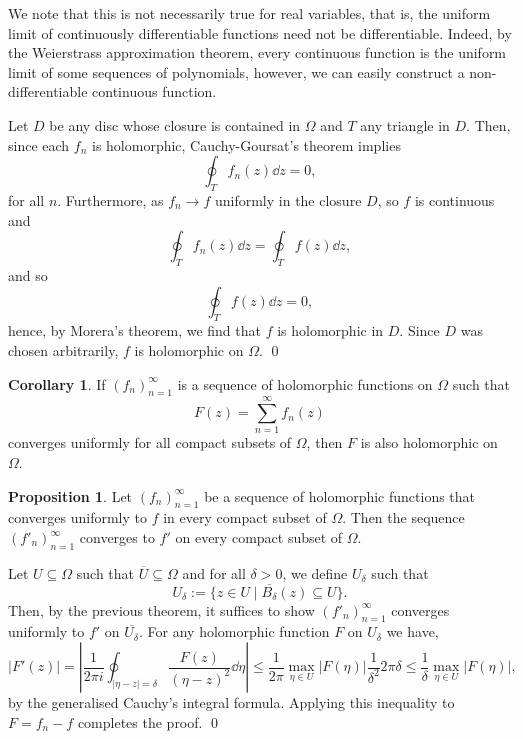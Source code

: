 \documentclass[
]{article}
\theoremstyle{definition}
\newtheorem{prop}{Proposition}
\newtheorem{corollary}{Corollary}[theorem]
\theoremstyle{definition}
\begin{document}
We note that this is not necessarily true for real variables, that is,
the uniform limit of continuously differentiable functions need not be
differentiable. Indeed, by the Weierstrass approximation theorem, every
continuous function is the uniform limit of some sequences of
polynomials, however, we can easily construct a non-differentiable
continuous function.

\proof

Let \(D\) be any disc whose closure is contained in \(\Omega\) and \(T\)
any triangle in \(D\). Then, since each \(f_n\) is holomorphic,
Cauchy-Goursat's theorem implies \[\oint_T f_n(z) \dd z = 0,\] for all
\(n\). Furthermore, as \(f_n \to f\) uniformly in the closure \(D\), so
\(f\) is continuous and \[\oint_T f_n(z) \dd z = \oint_T f(z) \dd z,\]
and so \[\oint_T f(z) \dd z  = 0,\] hence, by Morera's theorem, we find
that \(f\) is holomorphic in \(D\). Since \(D\) was chosen arbitrarily,
\(f\) is holomorphic on \(\Omega\). \qed

\begin{corollary}
  If  \((f_n)_{n = 1}^\infty\) is a sequence of holomorphic functions on \(\Omega\) 
  such that 
  \[F(z) = \sum_{n = 1}^\infty f_n(z)\]
  converges uniformly for all compact subsets of \(\Omega\), then \(F\) is also 
  holomorphic on \(\Omega\).
\end{corollary}

\begin{prop}
  Let \((f_n)_{n = 1}^\infty\) be a sequence of holomorphic functions that converges 
  uniformly to \(f\) in every compact subset of \(\Omega\). Then the sequence 
  \((f'_n)_{n = 1}^\infty\) converges to \(f'\) on every compact subset of \(\Omega\).
\end{prop}
\proof

Let \(U \subseteq \Omega\) such that \(\overline{U} \subseteq \Omega\)
and for all \(\delta > 0\), we define \(U_\delta\) such that
\[U_\delta := \{z \in U \mid \overline{B_\delta}(z) \subseteq U\}.\]
Then, by the previous theorem, it suffices to show
\((f'_n)_{n = 1}^\infty\) converges uniformly to \(f'\) on
\(\overline{U_\delta}\). For any holomorphic function \(F\) on
\(U_\delta\) we have,
\[|F'(z)| = \left|\frac{1}{2\pi i} \oint_{|\eta - z| = 
    \delta}\frac{F(z)}{(\eta - z)^2} \dd \eta \right| 
    \le \frac{1}{2\pi}\max_{\eta \in U}|F(\eta)| \frac{1}{\delta^2} 2\pi\delta \le 
    \frac{1}{\delta}\max_{\eta \in U}|F(\eta)|,\] by the generalised
Cauchy's integral formula. Applying this inequality to \(F = f_n - f\)
completes the proof. \qed
\end{document}

